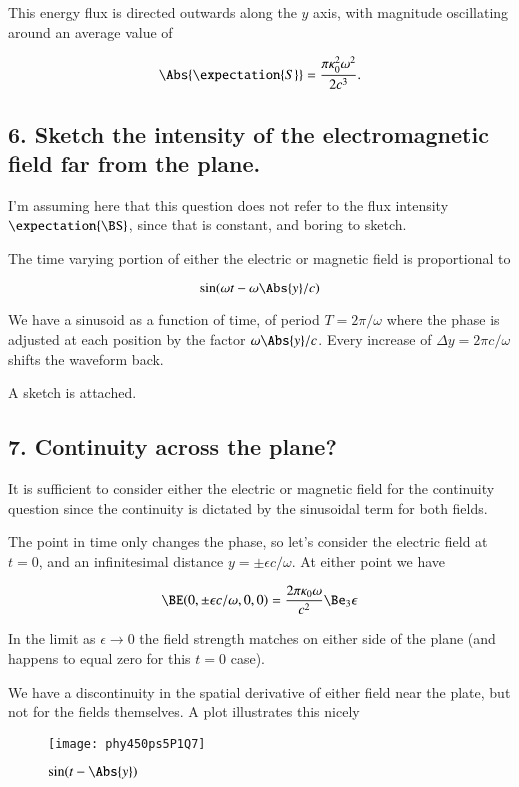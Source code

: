 This energy flux is directed outwards along the $y$ axis, with magnitude oscillating around an average value of

\begin{equation}\label{eqn:relElectroDynProblemSet5P1:260}
\Abs{\expectation{S}} = \frac{ \pi \kappa_0^2 \omega^2 }{2 c^3}.
\end{equation}

\subsection{6. Sketch the intensity of the electromagnetic field far from the plane.}

I'm assuming here that this question does not refer to the flux intensity $\expectation{\BS}$, since that is constant, and boring to sketch.

The time varying portion of either the electric or magnetic field is proportional to

\begin{equation}\label{eqn:relElectroDynProblemSet5P1:261}
\sin( \omega t - \omega \Abs{y}/c )
\end{equation}

We have a sinusoid as a function of time, of period $T = 2 \pi/\omega$ where the phase is adjusted at each position by the factor $\omega \Abs{y}/c$.  Every increase of $\Delta y = 2 \pi c/\omega$ shifts the waveform back.

A sketch is attached.

\subsection{7. Continuity across the plane?}

It is sufficient to consider either the electric or magnetic field for the continuity question since the continuity is dictated by the sinusoidal term for both fields.

The point in time only changes the phase, so let's consider the electric field at $t=0$, and an infinitesimal distance $y = \pm \epsilon c/\omega$.  At either point we have

\begin{equation}\label{eqn:relElectroDynProblemSet5P1:262}
\BE(0, \pm \epsilon c/\omega, 0, 0) = \frac{ 2 \pi \kappa_0 \omega }{c^2} \Be_3 \epsilon
\end{equation}

In the limit as $\epsilon \rightarrow 0$ the field strength matches on either side of the plane (and happens to equal zero for this $t= 0$ case).

We have a discontinuity in the spatial derivative of either field near the plate, but not for the fields themselves.  A plot illustrates this nicely

\begin{figure}[htp]
\centering
\texttt{[image: phy450ps5P1Q7]}
\caption{$\sin(t - \Abs{y})$}\label{fig:phy450ps5P1Q7}
\end{figure}

